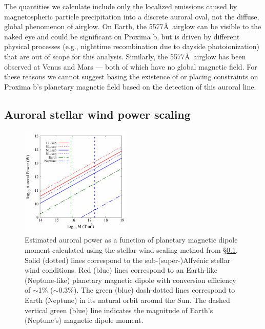 \documentclass[apjl]{emulateapj}
\begin{document}
The quantities we calculate include only the localized emissions caused by magnetospheric particle precipitation into a discrete auroral oval, not the diffuse, global phenomenon of airglow. On Earth, the 5577\AA\ airglow can be visible to the naked eye and could be significant on Proxima b, but is driven by different physical processes (e.g., nighttime recombination due to dayside photoionization) that are out of scope for this analysis. Similarly, the 5577\AA\ airglow has been observed at Venus \citep[e.g.][]{Slanger2001} and Mars \citep[e.g.][]{Seth2002} --- both of which have no global magnetic field. For these reasons we cannot suggest basing the existence of or placing constraints on Proxima b's planetary magnetic field based on the detection of this auroral line.


\subsection{Auroral stellar wind power scaling}
\label{sec:signal_m1}

\begin{figure}[bt]
\includegraphics[width=0.47\textwidth, angle=0]{plot_swpower.pdf}
\caption{Estimated auroral power as a function of planetary magnetic dipole moment calculated using the stellar wind scaling method from \S\ref{sec:signal_m1}. Solid (dotted) lines correspond to the sub-(super-)Alfv\'{e}nic stellar wind conditions. Red (blue) lines correspond to an Earth-like (Neptune-like) planetary magnetic dipole with conversion efficiency of $\sim$1\% ($\sim$0.3\%). The green (blue) dash-dotted lines correspond to Earth (Neptune) in its natural orbit around the Sun. The dashed vertical green (blue) line indicates the magnitude of Earth's (Neptune's) magnetic dipole moment.\\[0.01in]}
\label{fig:auroral_power}
\end{figure}
\end{document}
